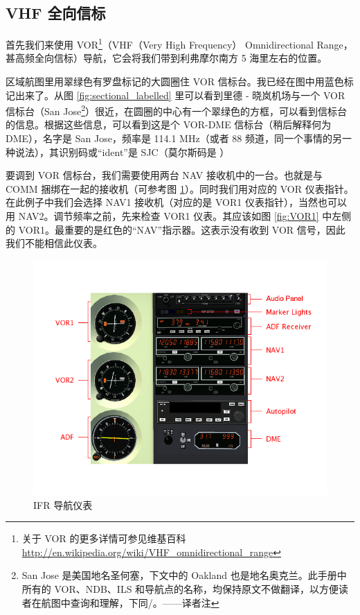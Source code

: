 \subsection{VHF 全向信标}

首先我们来使用 VOR\footnote{关于 VOR 的更多详情可参见维基百科 \url{http://en.wikipedia.org/wiki/VHF_omnidirectional_range}}（VHF（Very High Frequency） Omnidirectional Range，甚高频全向信标）导航，它会将我们带到利弗摩尔南方 5 海里左右的位置。

区域航图里用翠绿色有罗盘标记的大圆圈住 VOR 信标台。我已经在图中用蓝色标记出来了。从图 \ref{fig:sectional_labelled} 里可以看到里德 - 晓岚机场与一个 VOR 信标台（San Jose\footnote{San Jose 是美国地名圣何塞，下文中的 Oakland 也是地名奥克兰。此手册中所有的 VOR、NDB、ILS 和导航点的名称，均保持原文不做翻译，以方便读者在航图中查询和理解，下同/。——译者注}）很近，在圆圈的中心有一个翠绿色的方框，可以看到信标台的信息。根据这些信息，可以看到这是个 VOR-DME 信标台（稍后解释何为 DME），名字是 San Jose，频率是 114.1 MHz（或者 88 频道，同一个事情的另一种说法），其识别码或“ident”是 SJC（莫尔斯码是 \mdot\mdot\mdot\mspace\mdot\mdash\mdash\mdash\mspace \mdash\mdot\mdash\mdot）

要调到 VOR 信标台，我们需要使用两台 NAV 接收机中的一台。也就是与 COMM 捆绑在一起的接收机（可参考图 \ref{fig:panel}）。同时我们用对应的 VOR 仪表指针。在此例子中我们会选择 NAV1 接收机（对应的是 VOR1 仪表指针），当然也可以用 NAV2。调节频率之前，先来检查 VOR1 仪表。其应该如图 \ref{fig:VOR1} 中左侧的 VOR1。最重要的是红色的“NAV”指示器。这表示没有收到 VOR 信号，因此我们不能相信此仪表。

\begin{figure}
  \begin{center}
    \includegraphics[width=12cm]{img/panel_labelled}
    \caption{IFR 导航仪表}
    \label{fig:panel}
  \end{center}
\end{figure}


